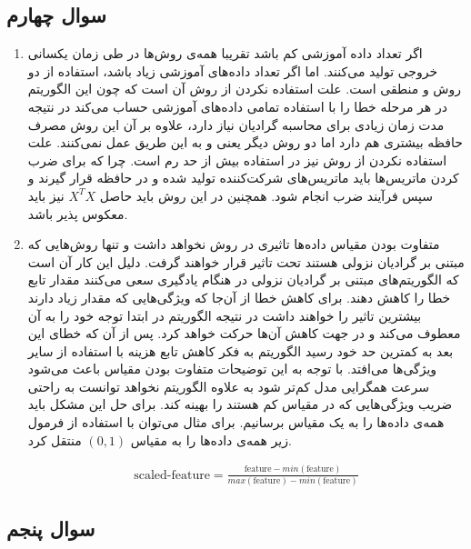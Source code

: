 \documentclass[14pt,a4]{article}
\begin{document}
\subsection*{سوال چهارم}

\begin{enumerate}[label=\alph* )]
    \item اگر تعداد داده‌ آموزشی کم باشد تقریبا همه‌ی روش‌ها در طی زمان یکسانی  خروجی تولید می‌کنند.
    اما اگر تعداد داده‌های آموزشی زیاد باشد، استفاده از دو روش  و 
    منطقی است. علت استفاده نکردن از روش  آن است که چون این الگوریتم در هر مرحله‌ خطا را با استفاده
    تمامی داده‌های آموزشی حساب می‌کند در نتیجه مدت زمان زیادی برای محاسبه‌ گرادیان نیاز دارد، علاوه بر آن
    این روش مصرف حافظه بیشتری هم دارد اما دو روش دیگر
    یعنی  و  به این طریق عمل نمی‌کنند. علت استفاده نکردن از روش
     نیز در استفاده بیش از حد رم است. چرا که برای ضرب کردن ماتریس‌ها باید ماتریس‌های
    شرکت‌کننده تولید شده و در حافظه قرار گیرند و سپس فرآیند ضرب انجام شود. همچنین در این روش باید حاصل
    $X^T X$ نیز باید معکوس پذیر باشد.
    \item متفاوت بودن مقیاس داده‌ها تاثیری در روش  نخواهد داشت و تنها روش‌هایی که
    مبتنی بر گرادیان نزولی هستند تحت تاثیر قرار خواهند گرفت. دلیل این کار آن است که الگوریتم‌های مبتنی بر گرادیان‌ نزولی
    در هنگام یادگیری سعی می‌کنند مقدار تابع خطا را کاهش دهند. برای کاهش خطا از آن‌جا که ویژگی‌هایی که مقدار
    زیاد دارند بیشترین تاثیر را خواهند داشت در نتیجه الگوریتم در ابتدا توجه خود را به آن معطوف می‌کند و
    در جهت کاهش آن‌ها حرکت خواهد کرد. پس از آن که خطای این بعد به کمترین حد خود رسید الگوریتم به فکر
    کاهش تابع هزینه با استفاده از سایر ویژگی‌ها می‌افتد. با توجه به این توضیحات متفاوت بودن مقیاس باعث می‌شود
    سرعت همگرایی مدل کم‌تر شود به علاوه الگوریتم نخواهد توانست به راحتی ضریب ویژگی‌هایی که در مقیاس کم هستند را
    بهینه کند. برای حل این مشکل باید همه‌ی داده‌ها را به یک مقیاس برسانیم. برای مثال می‌توان با استفاده از فرمول زیر همه‌ی داده‌ها را
    به مقیاس $(0,1)$ منتقل کرد.

    \begin{eqnarray*}
        \text{scaled-feature} = \frac{\text{feature} - min(\text{feature})}{max(\text{feature}) - min(\text{feature})}
    \end{eqnarray*}
\end{enumerate}

\subsection*{سوال پنجم}
\end{document}
